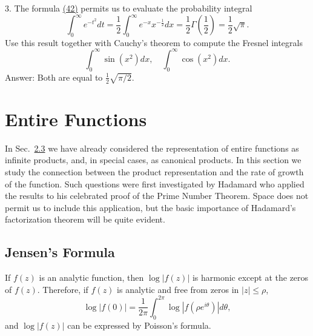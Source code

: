 3. The formula \hyperref[eq:5.42]{(42)} permits us to evaluate the probability integral
\begin{equation*}
\int_ {0} ^ {\infty} e ^ {- t ^ {2}} d t = \frac {1}{2} \int_ {0} ^ {\infty} e ^ {- x} x ^ {- \frac {1}{2}} d x = \frac {1}{2} \Gamma (\frac {1}{2}) = \frac {1}{2} \sqrt {\pi}.
\end{equation*}
Use this result together with Cauchy's theorem to compute the Fresnel integrals
\begin{equation*}
\int_ {0} ^ {\infty} \sin (x ^ {2}) d x, \quad \int_ {0} ^ {\infty} \cos (x ^ {2}) d x.
\end{equation*}
Answer: Both are equal to $\frac{1}{2}\sqrt{\pi / 2}$.

\setcounter{section}{2}\section{Entire Functions}\label{sec:5.3}
In Sec.~\hyperref[sec:5.2.3]{2.3} we have already considered the representation of entire functions as infinite products, and, in special cases, as canonical products. In this section we study the connection between the product representation and the rate of growth of the function. Such questions were first investigated by Hadamard who applied the results to his celebrated proof
of the Prime Number Theorem. Space does not permit us to include this application, but the basic importance of Hadamard's factorization theorem will be quite evident.

\setcounter{section}{3}\setcounter{subsection}{0}\subsection{Jensen's Formula}\label{sec:5.3.1}
If $f(z)$ is an analytic function, then $\log |f(z)|$ is harmonic except at the zeros of $f(z)$. Therefore, if $f(z)$ is analytic and free from zeros in $|z| \leq \rho$,
\begin{equation*}
\log | f (0) | = \frac {1}{2 \pi} \int_ {0} ^ {2 \pi} \log | f (\rho e ^ {i \theta}) | d \theta ,\tag{43}\label{eq:5.43}
\end{equation*}
and $\log |f(z)|$ can be expressed by Poisson's formula.

